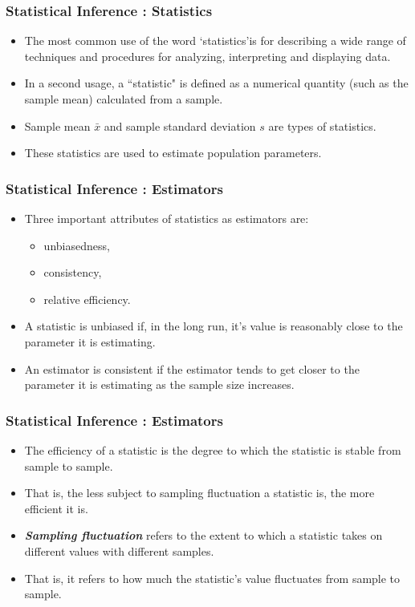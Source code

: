 \documentclass[a4]{beamer}
\begin{document}
\begin{frame}
\frametitle{Statistical Inference : Statistics}
\begin{itemize}
\item The most common use of the word `statistics'is for describing a wide range of techniques and procedures for analyzing, interpreting and displaying data.
\item In a second usage, a ``statistic" is defined as a numerical quantity (such as the sample mean) calculated from a sample.
\item Sample mean $\bar{x}$ and sample standard deviation $s$ are types of statistics.
\item These statistics are used to estimate population parameters.
\end{itemize}
\end{frame}

\begin{frame}
\frametitle{Statistical Inference : Estimators}
\begin{itemize}
\item Three important attributes of statistics as estimators are: \begin{itemize} \large
\item unbiasedness, \item consistency,  \item  relative efficiency.\end{itemize}
\item A statistic is unbiased if, in the long run, it's value is reasonably close to the parameter it is estimating.
\item An estimator is consistent if the estimator tends to get closer to the parameter it is estimating as the sample size increases.
\end{itemize}
\end{frame}

\begin{frame}
\frametitle{Statistical Inference : Estimators}
\begin{itemize}

\item The efficiency of a statistic is the degree to which the statistic is stable from sample to sample.
\item That is, the less subject to sampling fluctuation a statistic is, the more efficient it is.
\item \textbf{\emph{Sampling fluctuation}} refers to the extent to which a statistic takes on different values with different samples.
\item That is, it refers to how much the statistic's value fluctuates from sample to sample.

\end{itemize}
\end{frame}
\end{document}
